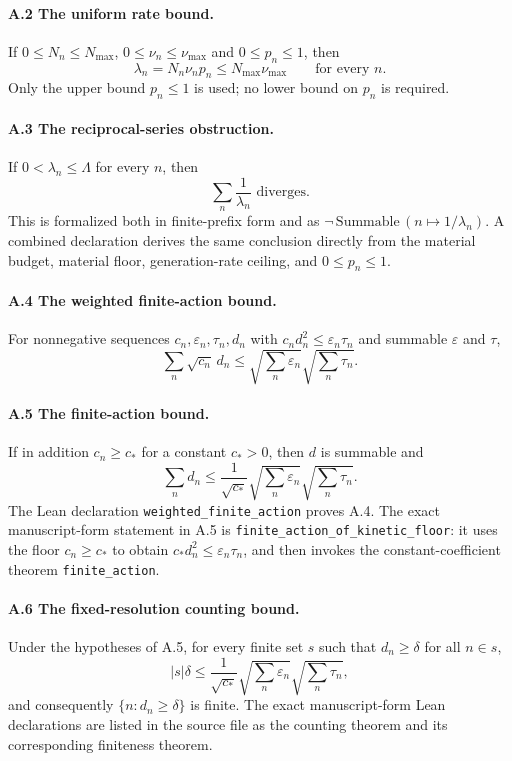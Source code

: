 \paragraph{A.2 The uniform rate bound.}
If $0\le N_n\le N_{\max}$, $0\le\nu_n\le\nu_{\max}$ and $0\le p_n\le1$, then
\[
\lambda_n=N_n\nu_np_n\le N_{\max}\nu_{\max}\qquad\text{for every }n.
\]
Only the upper bound $p_n\le1$ is used; no lower bound on $p_n$ is required.

\paragraph{A.3 The reciprocal-series obstruction.}
If $0<\lambda_n\le\Lambda$ for every $n$, then
\[
\sum_n\frac1{\lambda_n}\text{ diverges}.
\]
This is formalized both in finite-prefix form and as
$\neg\,\mathrm{Summable}\,(n\mapsto1/\lambda_n)$. A combined declaration
derives the same conclusion directly from the material budget, material floor,
generation-rate ceiling, and $0\le p_n\le1$.

\paragraph{A.4 The weighted finite-action bound.}
For nonnegative sequences $c_n,\varepsilon_n,\tau_n,d_n$ with
$c_nd_n^2\le\varepsilon_n\tau_n$ and summable $\varepsilon$ and $\tau$,
\[
\sum_n\sqrt{c_n}\,d_n
\le
\sqrt{\sum_n\varepsilon_n}\sqrt{\sum_n\tau_n}.
\]

\paragraph{A.5 The finite-action bound.}
If in addition $c_n\ge c_*$ for a constant $c_*>0$, then $d$ is summable and
\[
\sum_n d_n
\le
\frac1{\sqrt{c_*}}
\sqrt{\sum_n\varepsilon_n}\sqrt{\sum_n\tau_n}.
\]
The Lean declaration \texttt{weighted\_finite\_action} proves A.4.
The exact manuscript-form statement in A.5 is
\nolinkurl{finite_action_of_kinetic_floor}: it uses the floor
$c_n\ge c_*$ to obtain $c_*d_n^2\le\varepsilon_n\tau_n$, and then invokes
the constant-coefficient theorem \texttt{finite\_action}.

\paragraph{A.6 The fixed-resolution counting bound.}
Under the hypotheses of A.5, for every finite set $s$ such that
$d_n\ge\delta$ for all $n\in s$,
\[
|s|\delta
\le
\frac1{\sqrt{c_*}}
\sqrt{\sum_n\varepsilon_n}\sqrt{\sum_n\tau_n},
\]
and consequently $\{n:d_n\ge\delta\}$ is finite. The exact manuscript-form
Lean declarations are listed in the source file as the counting theorem and
its corresponding finiteness theorem.

